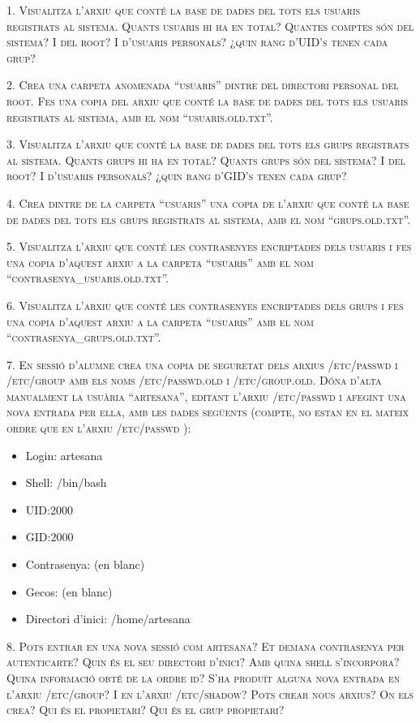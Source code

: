 \documentclass[a4paper,12pt]{article}
\begin{document}


\newpage
\textsc{1. Visualitza l’arxiu que conté la base de dades del tots els usuaris registrats al sistema. Quants usuaris hi ha en total? Quantes comptes són del sistema? I del root? I d’usuaris personals? ¿quin rang d’UID’s tenen cada grup?}

\textsc{2. Crea una carpeta anomenada “usuaris” dintre del directori personal del root. Fes una copia del arxiu que conté la base de dades del tots els usuaris registrats al sistema, amb el nom “usuaris.old.txt”.}

\textsc{3. Visualitza l’arxiu que conté la base de dades del tots els grups registrats al sistema. Quants grups hi ha en total? Quants grups són del sistema? I del root? I d’usuaris personals? ¿quin rang d’GID’s tenen cada grup?}

\textsc{4. Crea dintre de la carpeta “usuaris” una copia de l’arxiu que conté la base de dades del tots els grups registrats al sistema, amb el nom “grups.old.txt”.}

\textsc{5. Visualitza l’arxiu que conté les contrasenyes encriptades dels usuaris i fes una copia d’aquest arxiu a la carpeta “usuaris” amb el nom “contrasenya\_usuaris.old.txt”.}

\textsc{6. Visualitza l’arxiu que conté les contrasenyes encriptades dels grups i fes una copia d’aquest arxiu a la carpeta “usuaris” amb el nom “contrasenya\_grups.old.txt”.}

\textsc{7. En sessió d’alumne crea una copia de seguretat dels arxius  /etc/passwd i /etc/group amb els noms /etc/passwd.old i /etc/group.old.  Dóna d’alta manualment la usuària “artesana”, editant  l’arxiu /etc/passwd i afegint una nova entrada per ella, amb les dades següents (compte, no estan en el mateix ordre que en l’arxiu /etc/passwd ):}

\begin{itemize}
\item Login: artesana
\item Shell: /bin/bash
\item UID:2000
\item GID:2000
\item Contrasenya: (en blanc)
\item Gecos: (en blanc)
\item Directori d’inici: /home/artesana
\end{itemize}

\textsc{8. Pots entrar en una nova sessió com artesana? Et demana contrasenya per autenticarte? Quin és el seu directori d’inici? Amb quina shell s’incorpora? Quina informació obté de la ordre id? S’ha produït alguna nova entrada en l’arxiu /etc/group? I en l’arxiu  /etc/shadow? Pots crear nous arxius? On els crea? Qui és el propietari? Qui és el grup propietari?}
\end{document}

